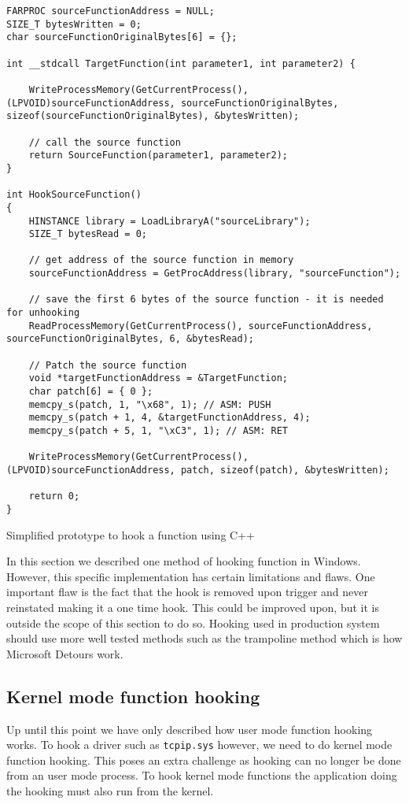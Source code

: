 \documentclass{report}
\begin{document}
\begin{listing}[H]
\begin{verbatim}
FARPROC sourceFunctionAddress = NULL;
SIZE_T bytesWritten = 0;
char sourceFunctionOriginalBytes[6] = {};

int __stdcall TargetFunction(int parameter1, int parameter2) {
	
	WriteProcessMemory(GetCurrentProcess(), (LPVOID)sourceFunctionAddress, sourceFunctionOriginalBytes, sizeof(sourceFunctionOriginalBytes), &bytesWritten);
	
	// call the source function
	return SourceFunction(parameter1, parameter2);
}

int HookSourceFunction()
{
	HINSTANCE library = LoadLibraryA("sourceLibrary");
	SIZE_T bytesRead = 0;
	
	// get address of the source function in memory
	sourceFunctionAddress = GetProcAddress(library, "sourceFunction");

	// save the first 6 bytes of the source function - it is needed for unhooking
	ReadProcessMemory(GetCurrentProcess(), sourceFunctionAddress, sourceFunctionOriginalBytes, 6, &bytesRead);
	
    // Patch the source function
	void *targetFunctionAddress = &TargetFunction;
	char patch[6] = { 0 };
	memcpy_s(patch, 1, "\x68", 1); // ASM: PUSH
	memcpy_s(patch + 1, 4, &targetFunctionAddress, 4);
	memcpy_s(patch + 5, 1, "\xC3", 1); // ASM: RET

	WriteProcessMemory(GetCurrentProcess(), (LPVOID)sourceFunctionAddress, patch, sizeof(patch), &bytesWritten);

	return 0;
}
\end{verbatim}
\caption{Simplified prototype to hook a function using C++}
\label{listing:c:hooking-prototype}
\end{listing}

In this section we described one method of hooking function in Windows. However, this specific implementation has certain limitations and flaws. One important flaw is the fact that the hook is removed upon trigger and never reinstated making it a one time hook. This could be improved upon, but it is outside the scope of this section to do so. Hooking used in production system should use more well tested methods such as the trampoline method\cite{url:hooking:halladay} which is how Microsoft Detours work\cite{url:hooking:detours}.

\subsection{Kernel mode function hooking}
\label{sec:hooking:kernel-mode}
Up until this point we have only described how user mode function hooking works. To hook a driver such as \texttt{tcpip.sys} however, we need to do kernel mode function hooking. This poses an extra challenge as hooking can no longer be done from an user mode process. To hook kernel mode functions the application doing the hooking must also run from the kernel.
\end{document}
